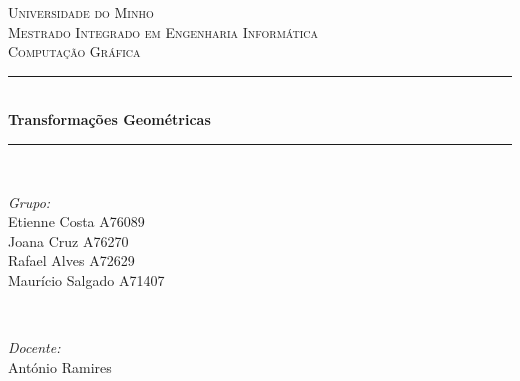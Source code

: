 \documentclass[12pt]{article}
\begin{document}
\begin{titlepage}

\newcommand{\HRule}{\rule{\linewidth}{0.5mm}} %

\center %
    

\textsc{\LARGE Universidade do Minho}\\[1.5cm] 
\textsc{\Large Mestrado Integrado em Engenharia Informática}\\[0.5cm] 
\textsc{\large Computação Gráfica}\\[0.5cm]


\HRule \\[0.4cm]
{ \huge \bfseries Transformações Geométricas}\\[0.4cm] 
\HRule \\[1.5cm]
    

\begin{minipage}{0.4\textwidth}
\begin{flushleft} \large
\emph{Grupo:}\\
Etienne Costa A76089 \\
Joana Cruz A76270 \\
Rafael Alves A72629 \\
Maurício Salgado A71407 \\
\end{flushleft}
\end{minipage}
~
\begin{minipage}{0.4\textwidth}
\begin{flushright} \large
\emph{Docente:} \\
António Ramires\\
\end{flushright}
\end{minipage}\\[2cm]


\end{titlepage}
\end{document}

